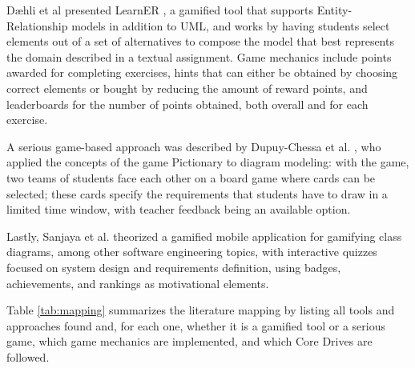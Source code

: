Dæhli et al presented LearnER \cite{daehli2021exploring}, a gamified tool that supports Entity-Relationship models in addition to UML, and works by having students select elements out of a set of alternatives to compose the model that best represents the domain described in a textual assignment. Game mechanics include points awarded for completing exercises, hints that can either be obtained by choosing correct elements or bought by reducing the amount of reward points, and leaderboards for the number of points obtained, both overall and for each exercise.

A serious game-based approach was described by Dupuy-Chessa et al. \cite{dupuychessa2015lego}, who applied the concepts of the game Pictionary to diagram modeling: with the game, two teams of students face each other on a board game where cards can be selected; these cards specify the requirements that students have to draw in a limited time window, with teacher feedback being an available option.

Lastly, Sanjaya et al. \cite{sanjaya2020development} theorized a gamified mobile application for gamifying class diagrams, among other software engineering topics, with interactive quizzes focused on system design and requirements definition, using badges, achievements, and rankings as motivational elements.

Table \ref{tab:mapping} summarizes the literature mapping by listing all tools and approaches found and, for each one, whether it is a gamified tool or a serious game, which game mechanics are implemented, and which Core Drives are followed.

